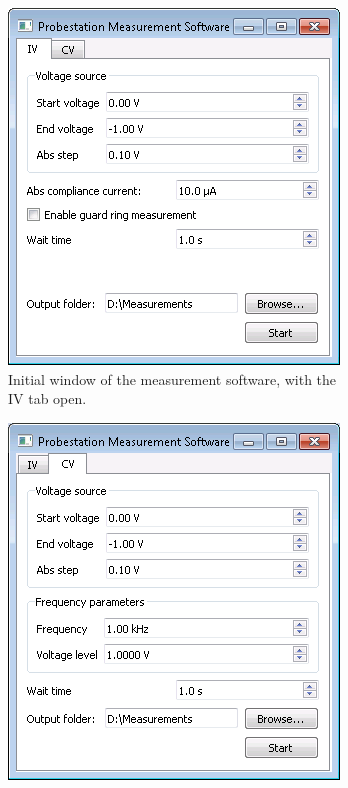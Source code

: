 \documentclass[a4paper]{article}
\begin{document}
\begin{figure}[hbtp]
\centering
\begin{subfigure}[t]{0.475\textwidth}
\centering\captionsetup{width=.8\linewidth}%
\includegraphics[width=\linewidth]{pictures/softiv.png}
\caption[Software with the IV Tab]{Initial window of the measurement software, with the IV tab open.}
\label{fig:softwareopeniv}
\end{subfigure}
\begin{subfigure}[t]{0.475\textwidth}
\centering\captionsetup{width=.8\linewidth}%
\includegraphics[width=\linewidth]{pictures/softcv.png}

\end{subfigure}
\end{figure}
\end{document}
